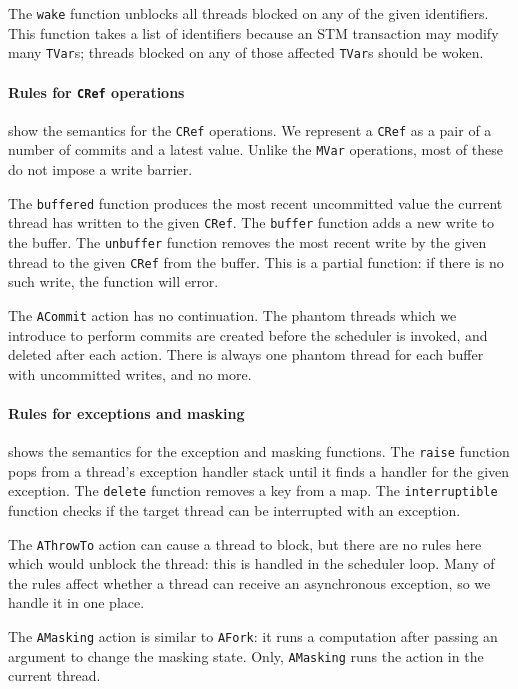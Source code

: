 The \verb|wake| function unblocks all threads blocked on any of the
given identifiers.  This function takes a list of identifiers because
an STM transaction may modify many \verb|TVar|s; threads blocked on
any of those affected \verb|TVar|s should be woken.

\paragraph{Rules for \texttt{CRef} operations}
 show the semantics for the
\verb|CRef| operations.  We represent a \verb|CRef| as a pair of a
number of commits and a latest value.  Unlike the \verb|MVar|
operations, most of these do not impose a write barrier.

The \verb|buffered| function produces the most recent uncommitted
value the current thread has written to the given \verb|CRef|.  The
\verb|buffer| function adds a new write to the buffer.  The
\verb|unbuffer| function removes the most recent write by the given
thread to the given \verb|CRef| from the buffer.  This is a partial
function: if there is no such write, the function will error.

The \verb|ACommit| action has no continuation.  The phantom threads
which we introduce to perform commits are created before the scheduler
is invoked, and deleted after each action.  There is always one
phantom thread for each buffer with uncommitted writes, and no more.

\paragraph{Rules for exceptions and masking}
 shows the semantics for the exception and masking
functions.  The \verb|raise| function pops from a thread's exception
handler stack until it finds a handler for the given exception.  The
\verb|delete| function removes a key from a map.  The
\verb|interruptible| function checks if the target thread can be
interrupted with an exception.

The \verb|AThrowTo| action can cause a thread to block, but there are
no rules here which would unblock the thread: this is handled in the
scheduler loop.  Many of the rules affect whether a thread can receive
an asynchronous exception, so we handle it in one place.

The \verb|AMasking| action is similar to \verb|AFork|: it runs a
computation after passing an argument to change the masking state.
Only, \verb|AMasking| runs the action in the current thread.

